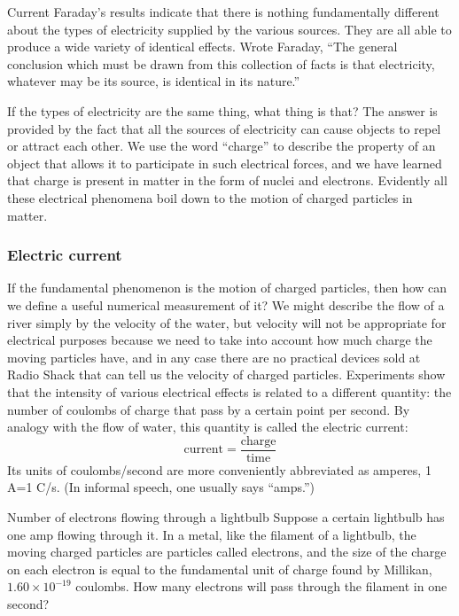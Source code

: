 \begin{envsubsection}{Current}
Faraday's results indicate that there is nothing fundamentally
different about the types of electricity supplied by the
various sources. They are all able to produce a wide variety
of identical effects. Wrote Faraday, ``The general
conclusion which must be drawn from this collection of facts
is that electricity, whatever may be its source, is
identical in its nature.''

If  the types of electricity are the same thing, what thing
is that? The answer is provided by the fact that all the
sources of electricity can cause objects to repel or attract
each other. We use the word ``charge'' to describe the
property of an object that allows it to participate in such
electrical forces, and we have learned that charge is
present in matter in the form of nuclei and electrons.
Evidently all these electrical phenomena boil down to the
motion of charged particles in matter.

\subsubsection{Electric current}
 If the fundamental phenomenon is the motion of charged
particles, then how can we define a useful numerical
measurement of it? We might describe the flow of a river
simply by the velocity of the water, but velocity will not
be appropriate for electrical purposes because we need to
take into account how much charge the moving particles have,
and in any case there are no practical devices sold at Radio
Shack that can tell us the velocity of charged particles.
Experiments show that the intensity of various electrical
effects is related to a different quantity: the number of
coulombs of charge that pass by a certain point per second.
By analogy with the flow of water, this quantity is called
the electric current:
\begin{equation*}
	\text{current} = \frac{\text{charge}}{\text{time}}
\end{equation*}
Its units of coulombs/second are more conveniently
abbreviated as amperes, 1 A=1 C/s.
(In informal speech, one usually says ``amps.'')


\begin{eg}{Number of electrons flowing through a lightbulb}
\egquestion Suppose a certain lightbulb has one amp flowing through it.
In a metal, like the filament of a lightbulb, the moving charged
particles are particles called electrons, and the size of the
charge on each electron is equal to the fundamental unit of
charge found by Millikan, $1.60\times10^{-19}$ coulombs.
How many electrons will pass through the filament in one second?


\end{eg}
\end{envsubsection}
